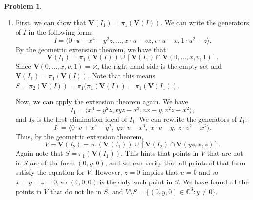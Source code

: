 \documentclass[12pt]{amsart}
\theoremstyle{definition}
\newtheorem{prob}{Problem}
\begin{document}
\begin{flushleft}
\begin{prob}
\begin{enumerate}
\begin{lstlisting}[language=Mathematica]
Out[6]= {x^4 - y^2 z, -x^3 + v y z, 
 v x - y, -x^2 + v^2 z, -x^2 + u y, u x - v z, u v - x, u^2 - z}
    \end{lstlisting}
    Since $I_2 = \langle G_2\rangle$, we get $I_2 = \langle x^4-y^2 z\rangle$. Thus, $V=\mathbf V(x^4-y^2z)$ is the smallest variety in $\mathbb C^3$ that contains $S$.
    \item[(b)] First, we can show that $\mathbf V(I_1) = \pi_1(\mathbf V(I))$. We can write the generators of $I$ in the following form:
    \[ 
        I = \langle 0\cdot u +x^4-y^2z, \dots, x \cdot u-vz, v\cdot u - x, 1 \cdot u^2 - z \rangle.
    \]
    By the geometric extension theorem, we have that
    \[ \mathbf V(I_1) = \pi_1(\mathbf V(I))\cup [\mathbf V(I_1)\cap \mathbf V(0,\dots, x,v,1)].\]
    Since $\mathbf V(0,\dots, x,v,1) = \varnothing$, the right hand side is the empty set and $\mathbf V(I_1) = \pi_1(\mathbf V(I))$. Note that this means $S = \pi_2 (\mathbf V(I)) = \pi_1 (\pi_1 (\mathbf V(I)) = \pi_1 (\mathbf V(I_1))$.
    
    Now, we can apply the extension theorem again. We have \[I_1 = \langle x^4 -y^2 z, v y z - x^3, vx-y, v^2 z - x^2 \rangle,\] and $I_2$ is the first elimination ideal of $I_1$. We can rewrite the generators of $I_1$:
    \[
    I_1 = \langle 0 \cdot v+x^4 -y^2, \; yz\cdot v-x^3,\; x\cdot v-y, \; z\cdot v^2-x^2\rangle.
    \]
    Thus, by the geometric extension theorem, \[V=\mathbf V(I_2)=\pi_1(\mathbf V(I_1)) \cup [\mathbf V(I_2)\cap \mathbf V(yz,x,z)].\]
    Again note that $S = \pi_1(\mathbf V(I_1))$. This hints that points in $V$ that are not in $S$ are of the form $(0,y,0)$, and we can verify that all points of that form satisfy the equation for $V$. However, $z=0$ implies that $u=0$ and so $x=y=z=0$, so $(0,0,0)$ is the only such point in $S$. We have found all the points in $V$ that do not lie in $S$, and $V \setminus S = \{(0,y,0) \in \mathbb C^3 : y \neq 0\}$.
\end{enumerate}

\end{prob}
\bigskip 




\end{flushleft}
\end{document}
